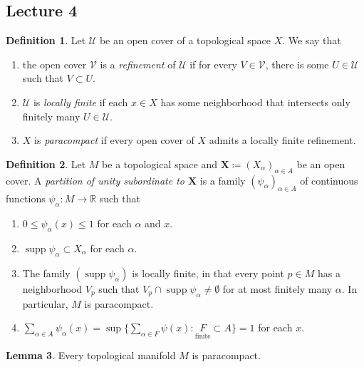 \documentclass[10pt,letterpaper,cm]{nupset}
\theoremstyle{definition}
\newtheorem{definition}{Definition}[subsection]
\theoremstyle{theorem}
\newtheorem{lemma}[definition]{Lemma}
\theoremstyle{remark}
\newcommand{\R}{\mathbb R}
\newcommand{\X}{\mathbf X}
\newcommand{\1}{\mathbf{1}}
\newcommand{\0}{\vec 0}
\DeclareMathOperator{\supp}{supp}
\begin{document}
\subsection{Lecture 4}

\begin{definition}
Let $\mathcal{U}$ be an open cover of a topological space $X$. We say that 
\begin{enumerate}
\item the open cover $\mathcal{V}$ is a \textit{refinement} of $\mathcal{U}$ if for every $V\in \mathcal{V}$, there is some $U \in \mathcal{U}$ such that $V \subset U$.
\item $\mathcal{U}$ is \textit{locally finite} if each $x\in X$ has some neighborhood that intersects only finitely many $U \in \mathcal{U}$. 
\item $X$ is \textit{paracompact} if every open cover of $X$ admits a locally finite refinement.
\end{enumerate}
\end{definition}

\begin{definition} Let $M$ be a topological space and $\X\coloneqq (X_\alpha)_{\alpha \in A}$ be an open cover. A \textit{partition of unity subordinate to $\X$} is a family $(\psi_\alpha)_{\alpha \in A}$ of continuous functions $\psi_\alpha : M \to \R$ such that
\begin{enumerate}
\item $0\leq \psi_\alpha(x) \leq 1$ for each $\alpha$ and $x$.
\item $\supp \psi_\alpha \subset X_\alpha$ for each $\alpha$.
\item The family $(\supp \psi_\alpha)$ is locally finite, in that every point $p\in M$ has a neighborhood $V_p$ such that $V_p \cap \supp \psi_\alpha \ne \emptyset$ for at most finitely many $\alpha$. In particular, $M$ is paracompact.
\item $\sum_{\alpha \in A} \psi_\alpha(x) = \sup\{\sum_{\alpha \in F}\psi(x) : \underset{\text{finite}} F \subset A\} = 1$ for each $x$.
\end{enumerate}
\end{definition}

\begin{lemma}
Every topological manifold $M$ is paracompact. 
\end{lemma}
\end{document}
